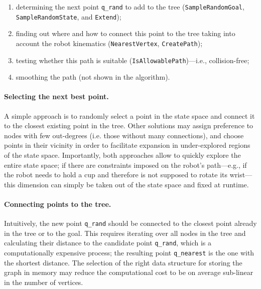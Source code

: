 \begin{enumerate}
    \item determining the next point \texttt{q\_rand} to add to the tree (\texttt{SampleRandomGoal}, \texttt{SampleRandomState}, and \texttt{Extend});
    \item finding out where and how to connect this point to the tree taking into account the robot kinematics (\texttt{NearestVertex}, \texttt{CreatePath});
    \item testing whether this path is suitable (\texttt{IsAllowablePath})---i.e., collision-free;
    \item smoothing the path (not shown in the algorithm).
\end{enumerate}

\paragraph{Selecting the next best point.}

A simple approach is to randomly select a point in the state space and connect it to the closest existing point in the tree.
Other solutions may assign preference to nodes with few out-degrees (i.e. those without many connections), and choose points in their vicinity in order to facilitate expansion in under-explored regions of the state space.
Importantly, both approaches allow to quickly explore the entire state space; if there are constraints imposed on the robot's path---e.g., if the robot needs to hold a cup and therefore is not supposed to rotate its wrist---this dimension can simply be taken out of the state space and fixed at runtime.

\paragraph{Connecting points to the tree.}

Intuitively, the new point \texttt{q\_rand} should be connected to the closest point already in the tree or to the goal.
This requires iterating over all nodes in the tree and calculating their distance to the candidate point \texttt{q\_rand}, which is a computationally expensive process; the resulting point \texttt{q\_nearest} is the one with the shortest distance.
The selection of the right data structure for storing the graph in memory may reduce the computational cost to be on average sub-linear in the number of vertices.

